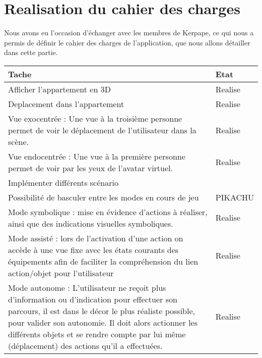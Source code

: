 \section{Realisation du cahier des charges}
Nous avons eu l'occasion d'échanger avec les membres de Kerpape, ce qui nous a permis de définir le cahier des charges de l'application, que nous allons détailler dans cette partie.
\begin{tabular}{|p{12cm}|l|}
	\hline
	Tache & Etat \\ \hline
	Afficher l'appartement en 3D & Realise \\ \hline
	Deplacement dans l'appartement & Realise \\ \hline
	Vue exocentrée : Une vue à la troisième personne permet de voir le déplacement de l'utilisateur dans la scène. & Realise \\ \hline
	Vue endocentrée : Une vue à la première personne permet de voir par les yeux de l'avatar  virtuel. & Realise \\ \hline
	
	Implémenter différents scénario \\ \hline
	Possibilité de basculer entre les modes en cours de jeu & PIKACHU \\ \hline
	Mode symbolique : mise en évidence d'actions à réaliser, ainsi que des indications visuelles symboliques. & Realise \\ \hline
	Mode assisté : lors de l'activation d'une action on accède à une vue fixe avec les états courants des équipements afin de faciliter la compréhension du lien action/objet pour l'utilisateur & Realise \\ \hline
	Mode autonome : L'utilisateur ne reçoit plus d'information ou d'indication pour effectuer son parcours, il est dans le décor le plus réaliste possible, pour valider son autonomie. Il doit alors actionner les différents objets et se rendre compte par lui même (déplacement) des actions qu'il a effectuées.  & Realise \\ \hline
	

\end{tabular}
